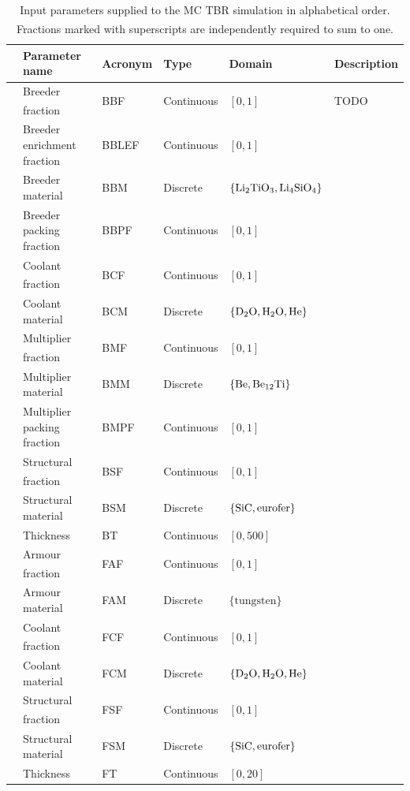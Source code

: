 \begin{table}[h]
	\centering
	{\footnotesize
		\begin{tabular}{l|lllll}
		\toprule
		{} & Parameter name & Acronym & Type & Domain & Description\\
		\midrule
		\parbox[t]{2mm}{}
		   & Breeder fraction\textsuperscript{\textdagger} & BBF & Continuous & $[0,1]$ & TODO\\
		   & Breeder  enrichment fraction & BBLEF & Continuous & $[0,1]$ & {}\\
		   & Breeder material & BBM & Discrete & $\{\ce{Li2TiO3}, \ce{Li4SiO4}\}$ & {}\\
		   & Breeder packing fraction & BBPF & Continuous & $[0,1]$ & {}\\
		   & Coolant fraction\textsuperscript{\textdagger} & BCF & Continuous & $[0,1]$ & {}\\
		   & Coolant material & BCM & Discrete & $\{\ce{D2O}, \ce{H2O}, \ce{He}\}$ & {}\\
		   & Multiplier fraction\textsuperscript{\textdagger} & BMF & Continuous & $[0,1]$ & {}\\
		   & Multiplier material & BMM & Discrete & $\{\ce{Be}, \ce{Be12Ti}\}$ & {}\\
		   & Multiplier packing fraction & BMPF & Continuous & $[0,1]$ & {}\\
		   & Structural fraction\textsuperscript{\textdagger} & BSF & Continuous & $[0,1]$ & {}\\
		   & Structural material & BSM & Discrete & $\{\ce{SiC}, \text{eurofer}\}$ & {}\\
		   & Thickness & BT & Continuous & $[0,500]$ & {}\\
		\midrule
		\parbox[t]{2mm}{}
		   & Armour fraction\textsuperscript{\textdaggerdbl} & FAF & Continuous & $[0,1]$ & {}\\
		   & Armour material & FAM & Discrete & $\{\text{tungsten}\}$ & {}\\
		   & Coolant fraction\textsuperscript{\textdaggerdbl} & FCF & Continuous & $[0,1]$ & {}\\
		   & Coolant material & FCM & Discrete & $\{\ce{D2O}, \ce{H2O}, \ce{He}\}$ & {}\\
		   & Structural fraction\textsuperscript{\textdaggerdbl} & FSF & Continuous & $[0,1]$ & {}\\
		   & Structural material & FSM & Discrete & $\{\ce{SiC}, \text{eurofer}\}$ & {}\\
		   & Thickness & FT & Continuous & $[0,20]$ & {}\\
		\bottomrule
		\end{tabular}
	}
	\caption{Input parameters supplied to the MC TBR simulation in alphabetical
		order. Fractions marked with superscripts\textsuperscript{\textdagger
		\textdaggerdbl} are independently required to sum to one.}
	\label{tbl:params}
\end{table}


